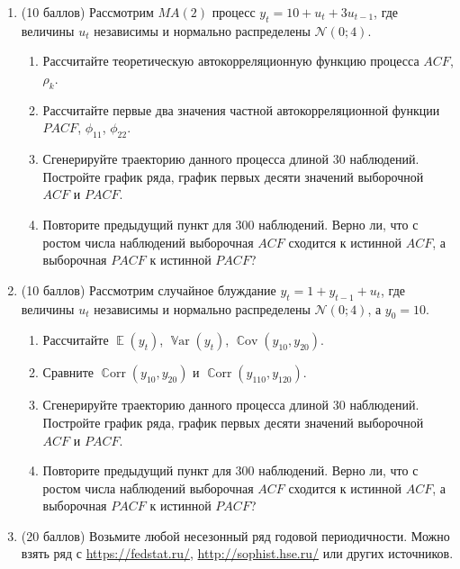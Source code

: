 \documentclass[12pt]{article}
\DeclareMathOperator{\Cov}{\mathbb{C}ov}
\DeclareMathOperator{\Corr}{\mathbb{C}orr}
\DeclareMathOperator{\Var}{\mathbb{V}ar}
\DeclareMathOperator{\E}{\mathbb{E}}
\newcommand \cN{\mathcal{N}}
\begin{document}
\begin{enumerate}

\item (10 баллов) Рассмотрим $MA(2)$ процесс $y_t = 10 + u_t + 3 u_{t-1}$, где величины $u_t$ независимы и нормально распределены 
$\cN(0;4)$.

\begin{enumerate}
    \item Рассчитайте теоретическую автокорреляционную функцию процесса $ACF$, $\rho_k$.
    \item Рассчитайте первые два значения частной автокорреляционной функции $PACF$, $\phi_{11}$, $\phi_{22}$.
    \item Сгенерируйте траекторию данного процесса длиной 30 наблюдений. 
    Постройте график ряда, график первых десяти значений выборочной $ACF$ и $PACF$. 
    \item Повторите предыдущий пункт для 300 наблюдений. 
    Верно ли, что с ростом числа наблюдений выборочная $ACF$ сходится к истинной $ACF$, а выборочная $PACF$ к истинной $PACF$?
\end{enumerate}


\item  (10 баллов) Рассмотрим случайное блуждание $y_t = 1 + y_{t-1} + u_t$, где величины $u_t$ независимы и нормально распределены 
$\cN(0;4)$, а $y_0 = 10$.

\begin{enumerate}
    \item Рассчитайте $\E(y_t)$, $\Var(y_t)$, $\Cov(y_{10}, y_{20})$.
    \item Сравните $\Corr(y_{10}, y_{20})$ и $\Corr(y_{110}, y_{120})$.
    \item Сгенерируйте траекторию данного процесса длиной 30 наблюдений. 
    Постройте график ряда, график первых десяти значений выборочной $ACF$ и $PACF$. 
    \item Повторите предыдущий пункт для 300 наблюдений. 
    Верно ли, что с ростом числа наблюдений выборочная $ACF$ сходится к истинной $ACF$, а выборочная $PACF$ к истинной $PACF$?
\end{enumerate}


\item (20 баллов)  Возьмите любой несезонный ряд годовой периодичности. 
Можно взять ряд с \url{https://fedstat.ru/}, \url{http://sophist.hse.ru/} или других источников. 


\end{enumerate}
\end{document}
